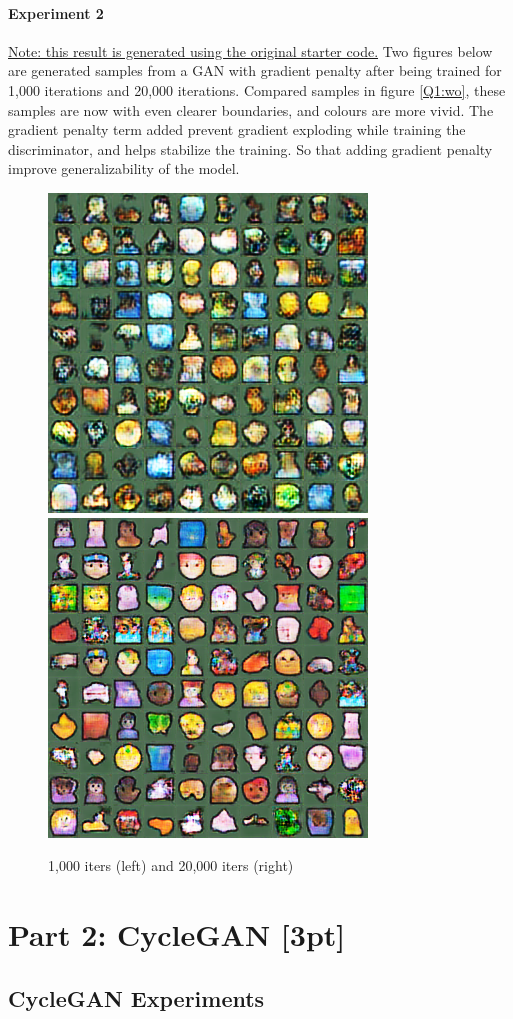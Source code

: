 \documentclass{article}
\begin{document}
	\paragraph{Experiment 2} 
	\ul{Note: this result is generated using the original starter code.}
	Two figures below are generated samples from a GAN with gradient penalty after being trained for 1,000 iterations and 20,000 iterations. Compared samples in figure \ref{Q1:wo}, these samples are now with even clearer boundaries, and colours are more vivid. The gradient penalty term added prevent gradient exploding while training the discriminator, and helps stabilize the training. So that adding gradient penalty improve generalizability of the model.  
	\begin{figure}[H]
		\centering
		\caption{1,000 iters (left) and 20,000 iters (right)}
		\includegraphics[width=0.45\linewidth]{./samples_dcgan_gp_alpha_alpha/sample-001000.png}
		\includegraphics[width=0.45\linewidth]{./samples_dcgan_gp_alpha_alpha/sample-020000.png}
	\end{figure}
	
	\section{Part 2: CycleGAN [3pt]}
	\subsection{CycleGAN Experiments}
\end{document}
